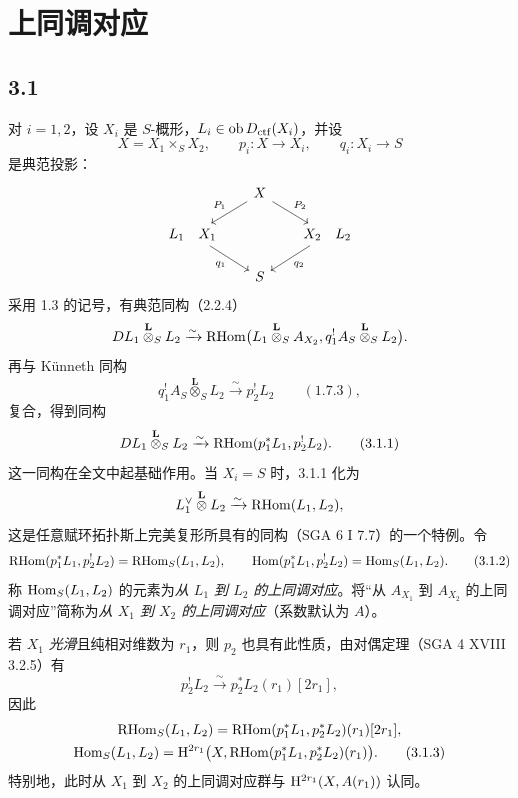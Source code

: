 \clearpage
\section{上同调对应}

\subsection*{3.1}
对 $i=1,2$，设 $X_i$ 是 $S$-概形，$L_i\in\operatorname{ob}D_{\mathrm{ctf}}(X_i)$，并设
\[
X=X_1\times_S X_2,
\qquad
p_i:X\longrightarrow X_i,
\qquad
q_i:X_i\longrightarrow S
\]
是典范投影：
\[
\begin{tikzcd}[column sep=1.8em,row sep=1.5em]
& X \arrow[dl,"P_1"'] \arrow[dr,"P_2"] & \\
L_1\quad X_1 \arrow[dr,"q_1"'] & & X_2\quad L_2 \arrow[dl,"q_2"] \\
& S &
\end{tikzcd}
\]
采用 1.3 的记号，有典范同构（2.2.4）
\[
DL_1\overset{\mathbf L}{\otimes}_S L_2
\xrightarrow{\sim}
\mathrm{RHom}\bigl(L_1\overset{\mathbf L}{\otimes}_S A_{X_2},
q_1^!A_S\overset{\mathbf L}{\otimes}_S L_2\bigr).
\]
再与 Künneth 同构
\[
q_1^!A_S\overset{\mathbf L}{\otimes}_S L_2
\xrightarrow{\sim}p_2^!L_2 \qquad (1.7.3),
\]
复合，得到同构
\begin{equation}
DL_1\overset{\mathbf L}{\otimes}_S L_2
\xrightarrow{\sim}
\mathrm{RHom}(p_1^*L_1,p_2^!L_2).
\tag{3.1.1}
\end{equation}
这一同构在全文中起基础作用。当 $X_i=S$ 时，3.1.1 化为
\[
L_1^\vee\overset{\mathbf L}{\otimes}L_2\xrightarrow{\sim}\mathrm{RHom}(L_1,L_2),
\]
这是任意赋环拓扑斯上完美复形所具有的同构（SGA 6 I 7.7）的一个特例。令
\begin{equation}
\mathrm{RHom}(p_1^*L_1,p_2^!L_2)=\mathrm{RHom}_S(L_1,L_2),
\qquad
\operatorname{Hom}(p_1^*L_1,p_2^!L_2)=\operatorname{Hom}_S(L_1,L_2).
\tag{3.1.2}
\end{equation}
称 $\operatorname{Hom}_S(L_1,L_2)$ 的元素为\emph{从 $L_1$ 到 $L_2$ 的上同调对应}。将“从 $A_{X_1}$ 到 $A_{X_2}$ 的上同调对应”简称为\emph{从 $X_1$ 到 $X_2$ 的上同调对应}（系数默认为 $A$）。

若 $X_1$ \emph{光滑}且纯相对维数为 $r_1$，则 $p_2$ 也具有此性质，由对偶定理（SGA 4 XVIII 3.2.5）有
\[
p_2^!L_2\xrightarrow{\sim}p_2^*L_2(r_1)[2r_1],
\]
因此
\begin{equation}\begin{gathered}
\mathrm{RHom}_S(L_1,L_2)=\mathrm{RHom}(p_1^*L_1,p_2^*L_2)(r_1)[2r_1],
\\
\operatorname{Hom}_S(L_1,L_2)=\mathrm{H}^{2r_1}\bigl(X,\mathrm{RHom}(p_1^*L_1,p_2^*L_2)(r_1)\bigr).
\tag{3.1.3}
\end{gathered}\end{equation}
特别地，此时从 $X_1$ 到 $X_2$ 的上同调对应群与 $\mathrm{H}^{2r_1}(X,A(r_1))$ 认同。

